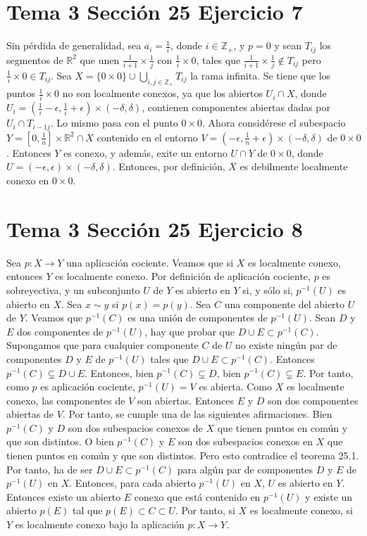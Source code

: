 \documentclass{article}
\begin{document}
\section{Tema 3 Sección 25 Ejercicio 7}
Sin pérdida de generalidad, sea $a_i=\frac{1}{i}$, donde $i\in \mathbb{Z}_+$, y $p=0$ y sean $T_{ij}$ los segmentos de $\mathbb{R}^2$ que unen $\frac{1}{i+1}\times\frac{1}{j} $ con $ \frac{1}{i}\times 0 $, tales que $\frac{1}{i+1}\times\frac{1}{j}\notin T_{ij}$ pero $\frac{1}{i}\times 0\in T_{ij}$. Sea $X= \{0\times 0\}\cup \bigcup_{i,j\in \mathbb{Z}_+} T_{ij}$ la rama infinita. Se tiene que los puntos $\frac{1}{i}\times 0$ no son localmente conexos, ya que los abiertos $U_i\cap X$, donde $U_i=(\frac{1}{i}-\epsilon,\frac{1}{i}+\epsilon)\times (-\delta,\delta)$, contienen componentes abiertas dadas por $U_i\cap T_{i-1j}$. Lo mismo pasa con el punto $0\times 0$. Ahora considérese el subespacio $Y= [0,\frac{1}{n}]\times \mathbb{R}^2\cap X$ contenido en el entorno $V=(-\epsilon,\frac{1}{n}+\epsilon)\times (-\delta,\delta)$ de $0\times 0$.  Entonces $Y$ es conexo, y además, exite un entorno $U\cap Y$ de $0\times 0$, donde $U=(-\epsilon,\epsilon)\times (-\delta,\delta)$. Entonces, por definición, $X$ es debilmente localmente conexo en $0\times 0$.
\section{Tema 3 Sección 25 Ejercicio 8}
Sea $p:X\rightarrow Y$ una aplicación cociente. Veamos que si $X$ es localmente conexo, entonces $Y$ es localmente conexo. Por definición de aplicación cociente, $p$ es sobreyectiva, y un subconjunto $U$ de $Y$ es abierto en $Y$ si, y sólo si, $p^{-1}(U)$ es abierto en $X$. Sea $x\sim y$ si $p(x)=p(y)$. Sea $C$ una componente del abierto $U$ de $Y$. Veamos que $p^{-1}(C)$ es una unión de componentes de $p^{-1}(U)$. Sean $D$ y $E$ dos componentes de $p^{-1}(U)$, hay que probar que $D\cup E\subset p^{-1}(C)$. Supongamos que para cualquier componente $C$ de $U$ no existe ningún par de componentes $D$ y $E$ de $p^{-1}(U)$ tales que $ D\cup E\subset p^{-1}(C)$. Entonces $p^{-1}(C)\subsetneq D\cup E$. Entonces, bien $p^{-1}(C)\subsetneq D$, bien $p^{-1}(C)\subsetneq E$. Por tanto, como $p$ es aplicación cociente, $p^{-1}(U)=V$ es abierta. Como $X$ es localmente conexo, las componentes de $V$ son abiertas. Entonces $E$ y $D$ son dos componentes abiertas de $V$. Por tanto, se cumple una de las siguientes afirmaciones. Bien $p^{-1}(C)$ y $D$ son dos subespacios conexos de $X$ que tienen puntos en común y que son distintos. O bien $p^{-1}(C)$ y $E$ son dos subespacios conexos en $X$ que tienen puntos en común y que son distintos. Pero esto contradice el teorema 25.1. Por tanto, ha de ser $D\cup E\subset p^{-1}(C)$ para algún par de componentes $D$ y $E$ de $p^{-1}(U)$ en $X$. Entonces, para cada abierto $p^{-1}(U)$ en $X$, $U$ es abierto en $Y$. Entonces existe un abierto $E$ conexo que está contenido en $p^{-1}(U)$ y existe un abierto $p(E)$ tal que $p(E)\subset C\subset U$. Por tanto, si $X$ es localmente conexo, si $Y$ es localmente conexo bajo la aplicación $p:X\rightarrow Y$.
\end{document}

